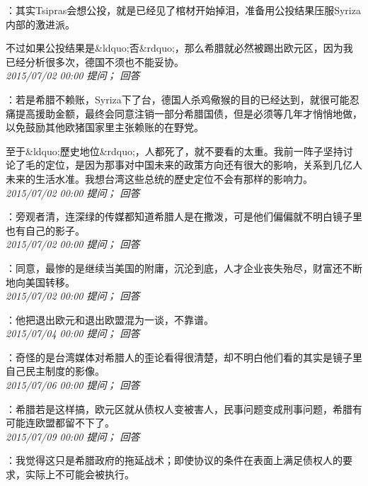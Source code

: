 \documentclass[twocolumn]{ctexart}
\begin{document}
：其实Tsipras会想公投，就是已经见了棺材开始掉泪，准备用公投结果压服Syriza内部的激进派。

不过如果公投结果是\&ldquo;否\&rdquo;，那么希腊就必然被踢出欧元区，因为我已经分析很多次，德国不须也不能妥协。\\

\textit{\hfill\noindent\small 2015/07/02 00:00 提问； 回答}

：若是希腊不赖账，Syriza下了台，德国人杀鸡儆猴的目的已经达到，就很可能忍痛提高援助金额，最终会同意注销一部分希腊国债，但是必须等几年才悄悄地做，以免鼓励其他欧猪国家里主张赖账的在野党。

至于\&ldquo;歷史地位\&rdquo;，人都死了，就不要看的太重。我前一阵子坚持讨论了毛的定位，是因为那事对中国未来的政策方向还有很大的影响，关系到几亿人未来的生活水准。我想台湾这些总统的歷史定位不会有那样的影响力。\\

\textit{\hfill\noindent\small 2015/07/02 00:00 提问； 回答}

：旁观者清，连深绿的传媒都知道希腊人是在撒泼，可是他们偏偏就不明白镜子里也有自己的影子。\\

\textit{\hfill\noindent\small 2015/07/02 00:00 提问； 回答}

：同意，最惨的是继续当美国的附庸，沉沦到底，人才企业丧失殆尽，财富还不断地向美国转移。\\

\textit{\hfill\noindent\small 2015/07/02 00:00 提问； 回答}

：他把退出欧元和退出欧盟混为一谈，不靠谱。\\

\textit{\hfill\noindent\small 2015/07/04 00:00 提问； 回答}

：奇怪的是台湾媒体对希腊人的歪论看得很清楚，却不明白他们看的其实是镜子里自己民主制度的影像。\\

\textit{\hfill\noindent\small 2015/07/06 00:00 提问； 回答}

：希腊若是这样搞，欧元区就从债权人变被害人，民事问题变成刑事问题，希腊有可能连欧盟都留不下了。\\

\textit{\hfill\noindent\small 2015/07/09 00:00 提问； 回答}

：我觉得这只是希腊政府的拖延战术；即使协议的条件在表面上满足债权人的要求，实际上不可能会被执行。
\end{document}
